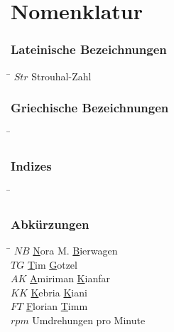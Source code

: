 \chapter*{Nomenklatur}


\subsection*{Lateinische Bezeichnungen}
\begin{tabbing}
\hspace*{2cm}\=\kill
$Str$ \> Strouhal-Zahl \\[0.2ex]
\end{tabbing}



\subsection*{Griechische Bezeichnungen}
\begin{tabbing}
\hspace*{2cm}\=\kill
\end{tabbing}



\subsection*{Indizes}
\begin{tabbing}
\hspace*{2cm}\=\kill
\end{tabbing}



\subsection*{Abk\"urzungen}
\begin{tabbing}
\hspace*{2cm}\=\kill
$NB$ \> \underline{N}ora M. \underline{B}ierwagen \\[0.2ex]
$TG$ \> \underline{T}im \underline{G}otzel \\[0.2ex]
$AK$ \> \underline{A}miriman \underline{K}ianfar \\[0.2ex]
$KK$ \> \underline{K}ebria \underline{K}iani \\[0.2ex]
$FT$ \> \underline{F}lorian \underline{T}imm \\[0.2ex]
$rpm$ \> Umdrehungen pro Minute \\[0.2ex]
\end{tabbing}

